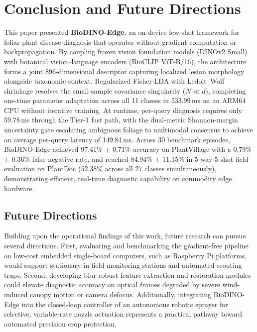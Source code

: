 \documentclass[preprint,12pt]{elsarticle}
\begin{document}
\section{Conclusion and Future Directions}
\label{sec:conclusion}

This paper presented \textbf{BioDINO-Edge}, an on-device few-shot framework for foliar plant disease diagnosis that operates without gradient computation or backpropagation. By coupling frozen vision foundation models (DINOv2 Small) with botanical vision--language encoders (BioCLIP ViT-B/16), the architecture forms a joint 896-dimensional descriptor capturing localized lesion morphology alongside taxonomic context. Regularized Fisher-LDA with Ledoit--Wolf shrinkage resolves the small-sample covariance singularity ($N \ll d$), completing one-time parameter adaptation across all 11 classes in 533.99\,ms on an ARM64 CPU without iterative training. At runtime, per-query diagnosis requires only 59.78\,ms through the Tier-1 fast path, with the dual-metric Shannon-margin uncertainty gate escalating ambiguous foliage to multimodal consensus to achieve an average per-query latency of 149.84\,ms. Across 30 benchmark episodes, BioDINO-Edge achieved 97.41\% $\pm$ 0.71\% accuracy on PlantVillage with a 0.79\% $\pm$ 0.36\% false-negative rate, and reached 84.94\% $\pm$ 11.15\% in 5-way 5-shot field evaluation on PlantDoc (52.38\% across all 27 classes simultaneously), demonstrating efficient, real-time diagnostic capability on commodity edge hardware.

\subsection{Future Directions}
Building upon the operational findings of this work, future research can pursue several directions. First, evaluating and benchmarking the gradient-free pipeline on low-cost embedded single-board computers, such as Raspberry Pi platforms, would support stationary in-field monitoring stations and automated scouting traps. Second, developing blur-robust feature extraction and restoration modules could elevate diagnostic accuracy on optical frames degraded by severe wind-induced canopy motion or camera defocus. Additionally, integrating BioDINO-Edge into the closed-loop controller of an autonomous robotic sprayer for selective, variable-rate nozzle actuation represents a practical pathway toward automated precision crop protection.
\appendix
\end{document}
